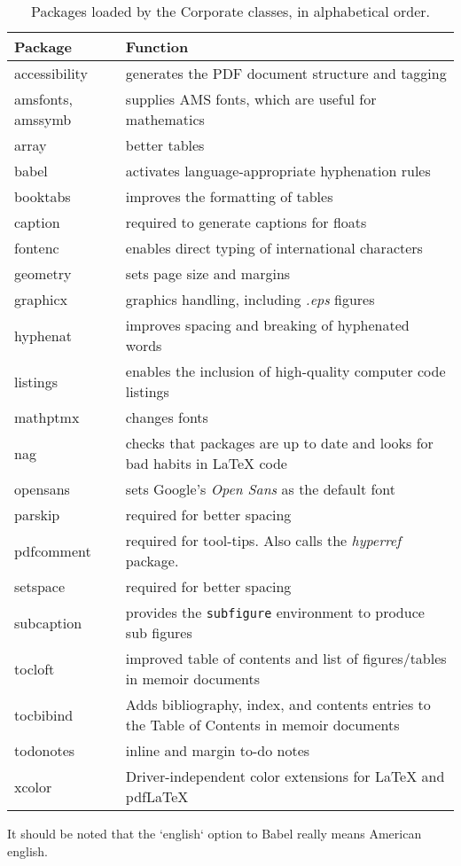 \begin{table*}[!ht]
\centering
\caption[Packages loaded by the Corporate classes]{Packages loaded by the Corporate classes, in alphabetical order.}
\label{Tab:Packages}
\begin{tabular}[h]{lb{}}
\toprule
Package & Function\\
\midrule
accessibility & generates the PDF document structure and tagging \\
amsfonts, amssymb& supplies AMS fonts, which are useful for mathematics \\
array & better tables\\
babel & activates language-appropriate hyphenation rules\\
booktabs & improves the formatting of tables \\
caption & required to generate captions for floats\\
fontenc & enables direct typing of international characters \\
geometry & sets page size and margins \\
graphicx & graphics handling, including \emph{.eps} figures \\
hyphenat & improves spacing and breaking of hyphenated words \\
listings & enables the inclusion of high-quality computer code listings\\
mathptmx & changes fonts \\
nag & checks that packages are up to date and looks for bad habits in LaTeX code\\
opensans & sets Google's \emph{Open Sans} as the default font\\
parskip & required for better spacing\\
pdfcomment & required for tool-tips. Also calls the \emph{hyperref} package.\\
setspace & required for better spacing\\
subcaption & provides the \texttt{subfigure} environment to produce sub figures \\
tocloft & improved table of contents and list of figures/tables in memoir documents\\
tocbibind & Adds bibliography, index, and contents entries to the Table of Contents in memoir documents\\
todonotes & inline and margin to-do notes \\
xcolor & Driver-independent color extensions for LaTeX and pdfLaTeX\\
\bottomrule
\end{tabular}
\end{table*}

It should be noted that the `english` option to Babel really means American english.
